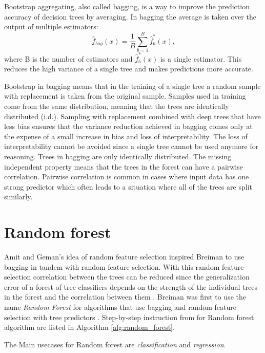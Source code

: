 Bootstrap aggregating, also called bagging, is a way to improve the prediction accuracy of decision trees by averaging. In bagging the average is taken over the output of multiple estimators:
\begin{equation}
    \hat {f}_{bag}(x) = \frac{1}{B}\sum_{b = 1}^{B} \hat {f}^{*}_{b}(x) \text{,}
\end{equation}
where B is the number of estimators and $\hat {f}^{*}_{b}(x)$ is a single estimator. This reduces the high variance of a single tree and makes predictions more accurate.

Bootstrap in bagging means that in the training of a single tree a random sample with replacement is taken from the original sample. Samples used in training come from the same distribution, meaning that the trees are identically distributed (i.d.). Sampling with replacement combined with deep trees that have less bias ensures that the variance reduction achieved in bagging comes only at the expense of a small increase in bias and loss of interpretability. The loss of interpretability cannot be avoided since a single tree cannot be used anymore for reasoning. Trees in bagging are only identically distributed. The missing independent property means that the trees in the forest can have a pairwise correlation. Pairwise correlation is common in cases where input data has one strong predictor which often leads to a situation where all of the trees are split similarly. \cite{friedman2001elements}

\section{Random forest}
Amit and Geman's \cite{amit1997shape} idea of random feature selection inspired Breiman to use bagging in tandem with random feature selection. With this random feature selection correlation between the trees can be reduced since the generalization error of a forest of tree classifiers depends on the strength of the individual trees in the forest and the correlation between them \cite{breiman2001random}. Breiman was first to use the name \textit{Random Forest} for algorithms that use bagging and random feature selection with tree predictors \cite{breiman2001random}. Step-by-step instruction from \cite{friedman2001elements} for Random forest algorithm are listed in Algorithm \ref{alg:random_forest}.

The Main usecases for Random forest are \textit{classification} and \textit{regression}.

